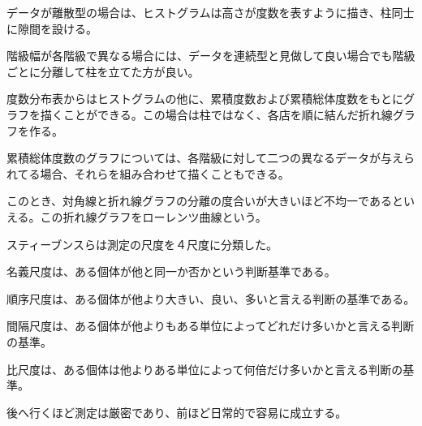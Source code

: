 \documentclass[a4paper,11pt]{jsarticle}
\begin{document}
データが離散型の場合は、ヒストグラムは高さが度数を表すように描き、柱同士に隙間を設ける。

階級幅が各階級で異なる場合には、データを連続型と見做して良い場合でも階級ごとに分離して柱を立てた方が良い。

度数分布表からはヒストグラムの他に、累積度数および累積総体度数をもとにグラフを描くことができる。この場合は柱ではなく、各店を順に結んだ折れ線グラフを作る。

累積総体度数のグラフについては、各階級に対して二つの異なるデータが与えられてる場合、それらを組み合わせて描くこともできる。

このとき、対角線と折れ線グラフの分離の度合いが大きいほど不均一であるといえる。この折れ線グラフをローレンツ曲線という。

スティーブンスらは測定の尺度を４尺度に分類した。

名義尺度は、ある個体が他と同一か否かという判断基準である。

順序尺度は、ある個体が他より大きい、良い、多いと言える判断の基準である。

間隔尺度は、ある個体が他よりもある単位によってどれだけ多いかと言える判断の基準。

比尺度は、ある個体は他よりある単位によって何倍だけ多いかと言える判断の基準。

後へ行くほど測定は厳密であり、前ほど日常的で容易に成立する。
\end{document}
